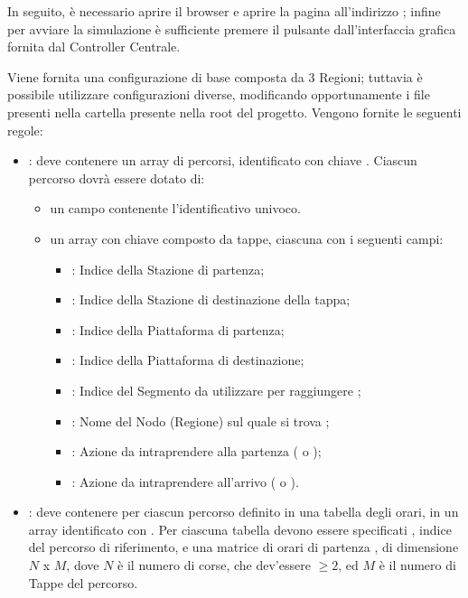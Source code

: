	In seguito, è necessario aprire il browser  e aprire la pagina all'indirizzo ; infine per avviare la simulazione è sufficiente premere il pulsante  dall'interfaccia grafica fornita dal Controller Centrale.
	 
	Viene fornita una configurazione di base composta da 3 Regioni; tuttavia è possibile utilizzare configurazioni diverse, modificando opportunamente i file  presenti nella cartella  presente nella root del progetto. Vengono fornite le seguenti regole:
	\begin{itemize}
		\item {}: deve contenere un array di percorsi, identificato con chiave . Ciascun percorso dovrà essere dotato di:
			\begin{itemize}
				\item un campo  contenente l'identificativo univoco.
				\item un array con chiave  composto da tappe, ciascuna con i seguenti campi:
					\begin{itemize}
						\item {}: Indice della Stazione di partenza;
						\item {}: Indice della Stazione di destinazione della tappa;
						\item {}: Indice della Piattaforma di partenza;
						\item {}: Indice della Piattaforma di destinazione;
						\item {}: Indice del Segmento da utilizzare per raggiungere ;
						\item {}: Nome del Nodo (Regione) sul quale si trova ;
						\item {}: Azione da intraprendere alla partenza ( o );
						\item {}: Azione da intraprendere all'arrivo ( o ).
					\end{itemize}
			\end{itemize}
		\item {}: deve contenere per ciascun percorso definito in  una tabella degli orari, in un array identificato con . Per ciascuna tabella devono essere specificati , indice del percorso di riferimento, e una matrice di orari di partenza , di dimensione $N$ x $M$, dove $N$ è il numero di corse, che dev'essere $\ge 2$, ed $M$ è il numero di Tappe del percorso.

\end{itemize}
